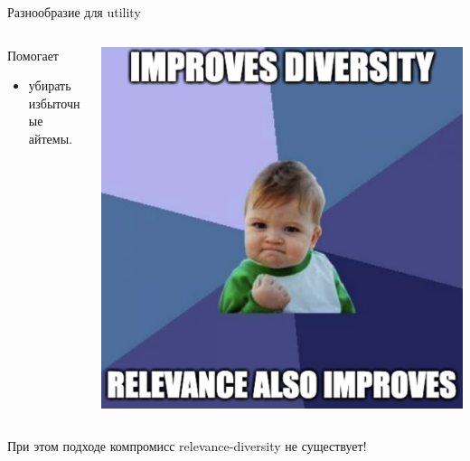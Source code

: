 \documentclass[11pt,aspectratio=169,handout]{beamer}
\begin{document}
\begin{frame}{Разнообразие для utility}

\begin{columns}

\begin{column}{0.45\textwidth}
Помогает
\begin{itemize}
\item убирать избыточные айтемы.
\end{itemize}
\end{column}

\begin{column}{0.45\textwidth} 
\begin{center}
\includegraphics[scale=0.2]{images/champ.png}
\end{center}
\end{column}

\end{columns}

\vfill

\begin{tcolorbox}[colback=info!5,colframe=info!80,title=]
При этом подходе компромисс relevance-diversity не существует!
\end{tcolorbox}

\end{frame}
\end{document}
